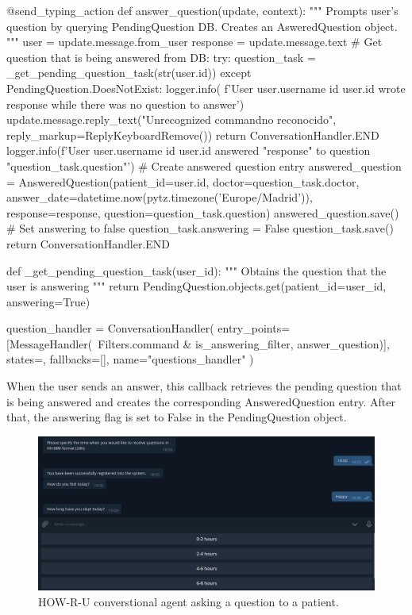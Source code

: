 \documentclass[12pt,english]{article}
\begin{document}
\begin{python}[caption={Questions handler}, captionpos=b]
@send_typing_action
def answer_question(update, context):
    """
    Prompts user's question by querying PendingQuestion DB.
    Creates an AsweredQuestion object.
    """
    user = update.message.from_user
    response = update.message.text
    # Get question that is being answered from DB:
    try:
        question_task = _get_pending_question_task(str(user.id))
    except PendingQuestion.DoesNotExist:
        logger.info(
            f'User {user.username} id {user.id} wrote {response} while there was no question to answer')
        update.message.reply_text("Unrecognized command\nComando no reconocido", reply_markup=ReplyKeyboardRemove())
        return ConversationHandler.END
    logger.info(f'User {user.username} id {user.id} answered "{response}" to question "{question_task.question}"')
    # Create answered question entry
    answered_question = AnsweredQuestion(patient_id=user.id, doctor=question_task.doctor, answer_date=datetime.now(pytz.timezone('Europe/Madrid')), response=response, question=question_task.question)
    answered_question.save()
    # Set answering to false
    question_task.answering = False
    question_task.save()
    return ConversationHandler.END

def _get_pending_question_task(user_id):
    """
    Obtains the question that the user is answering
    """
    return PendingQuestion.objects.get(patient_id=user_id, answering=True)


question_handler = ConversationHandler(
    entry_points=[MessageHandler(~Filters.command & is_answering_filter, answer_question)],
    states={},
    fallbacks=[],
    name="questions_handler"
)

\end{python}

When the user sends an answer, this callback retrieves the pending question that is being answered and creates the corresponding AnsweredQuestion entry. After that, the answering flag is set to False in the PendingQuestion object.

\begin{figure}[H]
  \centering
    \includegraphics[width=\textwidth]{bot_answering.png}
  \caption{HOW-R-U converstional agent asking a question to a patient.}
\end{figure}
\end{document}

